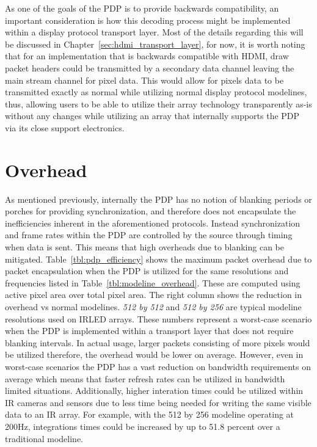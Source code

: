     As one of the goals of the PDP is to provide backwards compatibility, an important consideration is how this decoding process might be implemented within a display protocol transport layer. Most of the details regarding this will be discussed in Chapter~\ref{sec:hdmi_transport_layer}, for now, it is worth noting that for an implementation that is backwards compatible with HDMI, draw packet headers could be transmitted by a secondary data channel leaving the main stream channel for pixel data. This would allow for pixels data to be transmitted exactly as normal while utilizing normal display protocol modelines, thus, allowing users to be able to utilize their array technology transparently as-is without any changes while utilizing an array that internally supports the PDP via its close support electronics.

\section{Overhead}
    As mentioned previously, internally the PDP has no notion of blanking periods or porches for providing synchronization, and therefore does not encapsulate the inefficiencies inherent in the aforementioned protocols. Instead synchronization and frame rates within the PDP are controlled by the source through timing when data is sent. This means that high overheads due to blanking can be mitigated. Table~\ref{tbl:pdp_efficiency} shows the maximum packet overhead due to packet encapsulation when the PDP is utilized for the same resolutions and frequencies listed in Table~\ref{tbl:modeline_overhead}. These are computed using active pixel area over total pixel area. The right column shows the reduction in overhead vs normal modelines. {\it 512 by 512} and {\it 512 by 256} are typical modeline resolutions used on IRLED arrays. These numbers represent a worst-case scenario when the PDP is implemented within a transport layer that does not require blanking intervals. In actual usage, larger packets consisting of more pixels would be utilized therefore, the overhead would be lower on average. However, even in worst-case scenarios the PDP has a vast reduction on bandwidth requirements on average which means that faster refresh rates can be utilized in bandwidth limited situations. Additionally, higher interation times could be utilized within IR cameras and sensors due to less time being needed for writing the same visible data to an IR array. For example, with the 512 by 256 modeline operating at 200Hz, integrations times could be increased by up to 51.8 percent over a traditional modeline.

